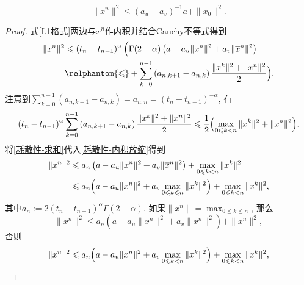 \begin{theorem}
    \begin{equation}\label{耗散性结果}
        \|x^n\|^2\leqslant \left(a_u-a_v\right)^{-1}a+\|x_0\|^2.
    \end{equation}
\end{theorem}
\begin{proof}
    式\eqref{L1格式}两边与$x^n$作内积并结合Cauchy不等式得到
    \begin{equation}\label{耗散性-内积放缩}
        \begin{aligned}
            \|x^n\|^2&\leqslant \left(t_n-t_{n-1}\right)^\alpha \Bigl( \Gamma(2-\alpha) \left(a-a_u \|x^n\|^2 + a_v \|\overline x^n\|^2\right)
            \\ &\relphantom{\leqslant} + \sum_{k=0}^{n-1} \left(a_{n,k+1}-a_{n,k}\right) \frac{\|x^k\|^2+\|x^n\|^2}{2}\Bigr).
        \end{aligned}
    \end{equation}
    注意到$\sum_{k=0}^{n-1} \left(a_{n,k+1}-a_{n,k}\right)=a_{n,n}=\left(t_n-t_{n-1}\right)^{-\alpha}$, 有
    \begin{equation}\label{耗散性-求和}
        \left(t_n-t_{n-1}\right)^\alpha \sum_{k=0}^{n-1} \left(a_{n,k+1}-a_{n,k}\right) \frac{\|x^k\|^2+\|x^n\|^2}{2}\leqslant\frac{1}{2}\Bigl(\max_{0\leqslant k<n} \|x^k\|^2 + \|x^n\|^2\Bigr).
    \end{equation}
    将\eqref{耗散性-求和}代入\cref{耗散性-内积放缩}得到
    \begin{align*}
        \|x^n\|^2 &\leqslant a_n \left(a-a_u \|x^n\|^2 + a_v \|\overline x^n\|^2\right) + \max_{0\leqslant k<n} \|x^k\|^2
        \\ &\leqslant a_n \Bigl(a-a_u \|x^n\|^2 + a_v \max_{0\leqslant k\leqslant n} \|x^k\|^2\Bigr) + \max_{0\leqslant k<n} \|x^k\|^2,
    \end{align*}
    其中$a_n:=2\left(t_n-t_{n-1}\right)^\alpha \Gamma(2-\alpha)$. 如果$\|x^n\|=\max_{0\leqslant k\leqslant n}$, 那么
    \begin{equation}
        \|x^n\|^2 \leqslant a_n \left(a-a_u \|x^n\|^2 + a_v \|x^n\|^2\right) + \|x^n\|^2,
    \end{equation}
    否则
    \begin{equation}
        \|x^n\|^2 \leqslant a_n \Bigl(a-a_u \|x^n\|^2 + a_v \max_{0\leqslant k< n} \|x^k\|^2\Bigr) + \max_{0\leqslant k< n} \|x^k\|^2,

\end{equation}
\end{proof}
